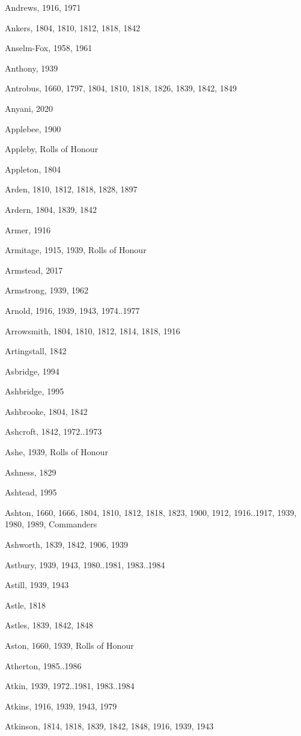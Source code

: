 \begin{theindex}
\item Andrews, 1916, 1971
\item Ankers, 1804, 1810, 1812, 1818, 1842
\item Anselm-Fox, 1958, 1961
\item Anthony, 1939
\item Antrobus, 1660, 1797, 1804, 1810, 1818, 1826, 1839, 1842, 1849
\item Anyani, 2020
\item Applebee, 1900
\item Appleby, Rolls of Honour
\item Appleton, 1804
\item Arden, 1810, 1812, 1818, 1828, 1897
\item Ardern, 1804, 1839, 1842
\item Armer, 1916
\item Armitage, 1915, 1939, Rolls of Honour
\item Armstead, 2017
\item Armstrong, 1939, 1962
\item Arnold, 1916, 1939, 1943, 1974..1977
\item Arrowsmith, 1804, 1810, 1812, 1814, 1818, 1916
\item Artingstall, 1842
\item Asbridge, 1994
\item Ashbridge, 1995
\item Ashbrooke, 1804, 1842
\item Ashcroft, 1842, 1972..1973
\item Ashe, 1939, Rolls of Honour
\item Ashness, 1829
\item Ashtead, 1995
\item Ashton, 1660, 1666, 1804, 1810, 1812, 1818, 1823, 1900, 1912, 1916..1917, 1939, 1980, 1989, Commanders
\item Ashworth, 1839, 1842, 1906, 1939
\item Astbury, 1939, 1943, 1980..1981, 1983..1984
\item Astill, 1939, 1943
\item Astle, 1818
\item Astles, 1839, 1842, 1848
\item Aston, 1660, 1939, Rolls of Honour
\item Atherton, 1985..1986
\item Atkin, 1939, 1972..1981, 1983..1984
\item Atkins, 1916, 1939, 1943, 1979
\item Atkinson, 1814, 1818, 1839, 1842, 1848, 1916, 1939, 1943

\end{theindex}
